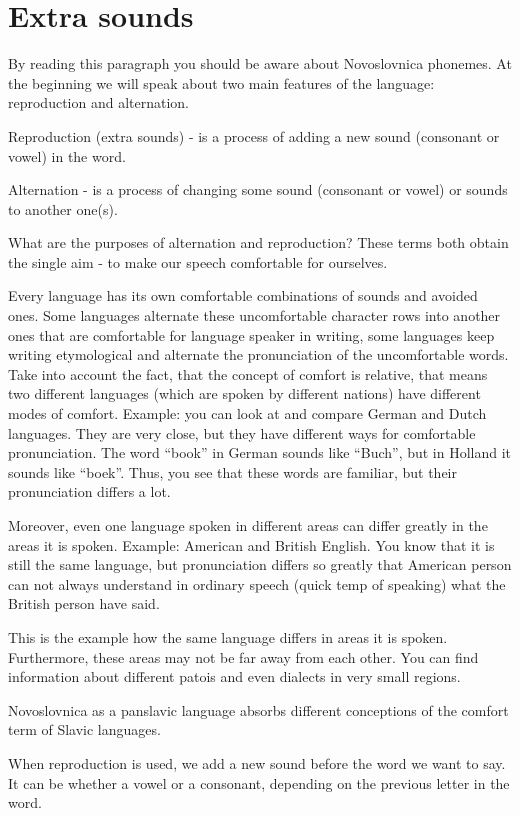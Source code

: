 \section{Extra sounds}

By reading this paragraph you should be aware about Novoslovnica phonemes. At the beginning we will speak about two main features of the language: reproduction and alternation.

Reproduction (extra sounds) - is a process of adding a new sound (consonant or vowel) in the word.

Alternation - is a process of changing some sound (consonant or vowel) or sounds to another one(s).

What are the purposes of alternation and reproduction? These terms both obtain the single aim - to make our speech comfortable for ourselves.

Every language has its own comfortable combinations of sounds and avoided ones. Some languages alternate these uncomfortable character rows into another ones that are comfortable for language speaker in writing, some languages keep writing etymological and alternate the pronunciation of the uncomfortable words. Take into account the fact, that the concept of comfort is relative, that means two different languages (which are spoken by different nations) have different modes of comfort.
Example: you can look at and compare German and Dutch languages. They are very close, but they have different ways for comfortable pronunciation. The word “book” in German sounds like “Buch”, but in Holland it sounds like “boek”. Thus, you see that these words are familiar, but their pronunciation differs a lot.

Moreover, even one language spoken in different areas can differ greatly in the areas it is spoken.
Example: American and British English. You know that it is still the same language, but pronunciation differs so greatly that American person can not always understand in ordinary speech (quick temp of speaking) what the British person have said.

This is the example how the same language differs in areas it is spoken. Furthermore, these areas may not be far away from each other. You can find information about different patois and even dialects in very small regions. 

Novoslovnica as a panslavic language absorbs different conceptions of the comfort term of Slavic languages.

When reproduction is used, we add a new sound before the word we want to say. It can be whether a vowel or a consonant, depending on the previous letter in the word.


